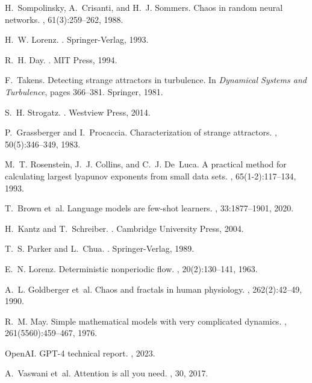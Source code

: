 \documentclass[11pt,a4paper]{article}
\begin{document}

\begin{thebibliography}{20}

H.~Sompolinsky, A.~Crisanti, and H.~J. Sommers.
\newblock Chaos in random neural networks.
, 61(3):259--262, 1988.

H.~W. Lorenz.
.
\newblock Springer-Verlag, 1993.

R.~H. Day.
.
\newblock MIT Press, 1994.

F.~Takens.
\newblock Detecting strange attractors in turbulence.
\newblock In {\em Dynamical Systems and Turbulence}, pages 366--381. Springer, 1981.

S.~H. Strogatz.
.
\newblock Westview Press, 2014.

P.~Grassberger and I.~Procaccia.
\newblock Characterization of strange attractors.
, 50(5):346--349, 1983.

M.~T. Rosenstein, J.~J. Collins, and C.~J. De~Luca.
\newblock A practical method for calculating largest lyapunov exponents from small data sets.
, 65(1-2):117--134, 1993.

T.~Brown et~al.
\newblock Language models are few-shot learners.
, 33:1877--1901, 2020.

H.~Kantz and T.~Schreiber.
.
\newblock Cambridge University Press, 2004.

T.~S. Parker and L.~Chua.
.
\newblock Springer-Verlag, 1989.

E.~N. Lorenz.
\newblock Deterministic nonperiodic flow.
, 20(2):130--141, 1963.

A.~L. Goldberger et~al.
\newblock Chaos and fractals in human physiology.
, 262(2):42--49, 1990.

R.~M. May.
\newblock Simple mathematical models with very complicated dynamics.
, 261(5560):459--467, 1976.

OpenAI.
\newblock GPT-4 technical report.
, 2023.

A.~Vaswani et~al.
\newblock Attention is all you need.
, 30, 2017.

\end{thebibliography}
\end{document}
